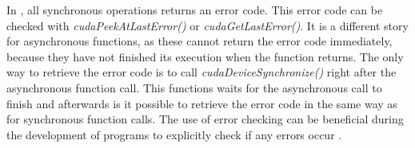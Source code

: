 In \cuda{}, all synchronous operations returns an error code.
This error code can be checked with \textit{cudaPeekAtLastError()} or \textit{cudaGetLastError()}.
It is a different story for asynchronous functions, as these cannot return the error code immediately, because they have not finished its execution when the function returns.
The only way to retrieve the error code is to call \textit{cudaDeviceSynchronize()} right after the asynchronous function call.
This functions waits for the asynchronous call to finish and afterwards is it possible to retrieve the error code in the same way as for synchronous function calls.
The use of error checking can be beneficial during the development of \cuda{} programs to explicitly check if any errors occur \cite{cuda:programmingguide}. 
 